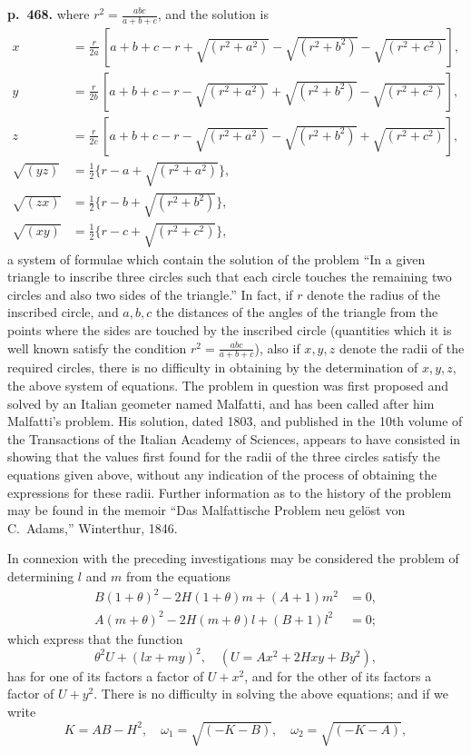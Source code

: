 \documentclass[11pt]{article}
\begin{document}
\bigskip
\noindent\textbf{p.~468.} where $r^2 = \tfrac{abc}{a + b + c}$, and the solution is
\[
\begin{aligned}
x &= \tfrac{r}{2a}\,[a + b + c - r + \sqrt{(r^2 + a^2)} - \sqrt{(r^2 + b^2)} - \sqrt{(r^2 + c^2)}],\\
y &= \tfrac{r}{2b}\,[a + b + c - r - \sqrt{(r^2 + a^2)} + \sqrt{(r^2 + b^2)} - \sqrt{(r^2 + c^2)}],\\
z &= \tfrac{r}{2c}\,[a + b + c - r - \sqrt{(r^2 + a^2)} - \sqrt{(r^2 + b^2)} + \sqrt{(r^2 + c^2)}],\\
\sqrt{(yz)} &= \tfrac{1}{2}\{r - a + \sqrt{(r^2 + a^2)}\},\\
\sqrt{(zx)} &= \tfrac{1}{2}\{r - b + \sqrt{(r^2 + b^2)}\},\\
\sqrt{(xy)} &= \tfrac{1}{2}\{r - c + \sqrt{(r^2 + c^2)}\},
\end{aligned}
\]
a system of formulae which contain the solution of the problem ``In a given triangle to inscribe three circles such that each circle touches the remaining two circles and also two sides of the triangle.'' In fact, if $r$ denote the radius of the inscribed circle, and $a, b, c$ the distances of the angles of the triangle from the points where the sides are touched by the inscribed circle (quantities which it is well known satisfy the condition $r^2 = \tfrac{abc}{a + b + c}$), also if $x, y, z$ denote the radii of the required circles, there is no difficulty in obtaining by the determination of $x, y, z$, the above system of equations. The problem in question was first proposed and solved by an Italian geometer named Malfatti, and has been called after him Malfatti's problem. His solution, dated 1803, and published in the 10th volume of the Transactions of the Italian Academy of Sciences, appears to have consisted in showing that the values first found for the radii of the three circles satisfy the equations given above, without any indication of the process of obtaining the expressions for these radii. Further information as to the history of the problem may be found in the memoir ``Das Malfattische Problem neu gel\"ost von C.~Adams,'' Winterthur, 1846.

In connexion with the preceding investigations may be considered the problem of determining $l$ and $m$ from the equations
\[
\begin{aligned}
B(1 + \theta)^2 - 2H(1 + \theta)m + (A + 1)m^2 &= 0,\\
A(m + \theta)^2 - 2H(m + \theta)l + (B + 1)l^2 &= 0;
\end{aligned}
\]
which express that the function
\[ \theta^2 U + (lx + my)^2,\quad (U = Ax^2 + 2Hxy + By^2), \]
has for one of its factors a factor of $U + x^2$, and for the other of its factors a factor of $U + y^2$. There is no difficulty in solving the above equations; and if we write
\[ K = AB - H^2,\quad \omega_1 = \sqrt{(-K - B)},\quad \omega_2 = \sqrt{(-K - A)}, \]
\end{document}
